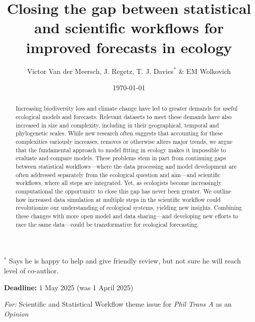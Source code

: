 \documentclass[11pt]{article}
\begin{document}
\title{Closing the gap between statistical and scientific workflows for improved forecasts in ecology } 
\date{\today}
\author{Victor Van der Meersch, J. Regetz, T. J. Davies$^*$ \& EM Wolkovich}
\maketitle
$^*$ Says he is happy to help and give friendly review, but not sure he will reach level of co-author. 

{\bf Deadline:} 1 May 2025 (was 1 April 2025)

\emph{For:} Scientific and Statistical Workflow theme issue for \emph{Phil Trans A} as an \emph{Opinion}


\begin{abstract}
Increasing biodiversity loss and climate change have led to greater demands for useful ecological models and forecasts. Relevant datasets to meet these demands have also increased in size and complexity, including in their geographical, temporal and phylogenetic scales. While new research often suggests that accounting for these complexities variously increases, removes or otherwise alters major trends, we argue that the fundamental approach to model fitting in ecology makes it impossible to evaluate and compare models. These problems stem in part from continuing gaps between statistical workflows---where the data processing and model development are often addressed separately from the ecological question and aim---and scientific workflows, where all steps are integrated. Yet, as ecologists become increasingly computational the opportunity to close this gap has never been greater. We outline how increased data simulation at multiple steps in the scientific workflow could revolutionize our understanding of ecological systems, yielding new insights. Combining these changes with more open model and data sharing---and developing new efforts to race the same data---could be transformative for ecological forecasting. 
\end{abstract}
\end{document}
